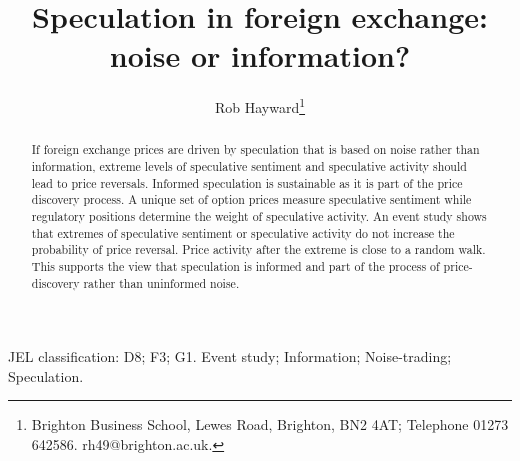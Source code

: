 \documentclass[preprint,12pt,authoryear]{elsarticle}
\begin{document}
\begin{frontmatter}
\title{Speculation in foreign exchange: noise or information?}
\author{Rob Hayward\footnote{Brighton Business School, Lewes Road, Brighton, BN2 4AT; Telephone 01273 642586.  rh49@brighton.ac.uk.}}

\begin{abstract}
If foreign exchange prices are driven by speculation that is based on noise rather than information, extreme levels of speculative sentiment and speculative activity should lead to price reversals. Informed speculation is sustainable as it is part of the price discovery process. A unique set of option prices measure speculative sentiment while regulatory positions determine the weight of speculative activity.  An event study shows that extremes of speculative sentiment or speculative activity do not increase the probability of price reversal.  Price activity after the extreme is close to a random walk. This supports the view that speculation is informed and part of the process of price-discovery rather than uninformed noise.      
\end{abstract}
\begin{keyword}
JEL classification: D8; F3; G1. Event study; Information; Noise-trading; Speculation.
\end{keyword}

\end{frontmatter}
\end{document}
